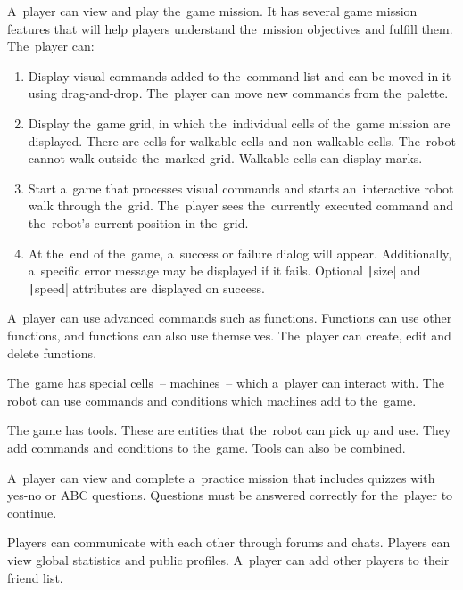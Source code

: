 \begin{enumerate}[label=\textbf{F\arabic*}, ref=\labelenumi]
    \pagebreak
     A~player can view and play the~game mission.
    It has several game mission features that will help players understand the~mission objectives and fulfill them.
    The~player can:
    \begin{enumerate}
        \item Display visual commands added to the~command list and can be moved in it using drag-and-drop.
        The~player can move new commands from the~palette.
        \item Display the~game grid, in which the~individual cells of the~game mission are displayed.
        There are cells for walkable cells and non-walkable cells.
        The~robot cannot walk outside the~marked grid.
        Walkable cells can display marks.
        \item Start a~game that processes visual commands and starts an~interactive robot walk through the~grid.
        The~player sees the~currently executed command and the~robot's current position in the~grid.
        \item At the~end of the~game, a~success or failure dialog will appear.
        Additionally, a~specific error message may be displayed if it fails.
        Optional \texttt|size| and \texttt|speed| attributes are displayed on success.
    \end{enumerate}

    \renewcommand{\labelenumi}{\textbf{F\arabic{enumi}}*}

     A~player can use advanced commands such as functions.
    Functions can use other functions, and functions can also use themselves.
    The~player can create, edit and delete functions.

     The~game has special cells~-- machines~-- which a~player can interact with.
    The robot can use commands and conditions which machines add to the~game.

     The game has tools.
    These are entities that the~robot can pick up and use.
    They add commands and conditions to the~game.
    Tools can also be combined.

     A~player can view and complete a~practice mission that includes quizzes with yes-no or ABC questions.
    Questions must be answered correctly for the~player to continue.

     Players can communicate with each other through forums and chats.
    Players can view global statistics and public profiles.
    A~player can add other players to their friend list.


\end{enumerate}
